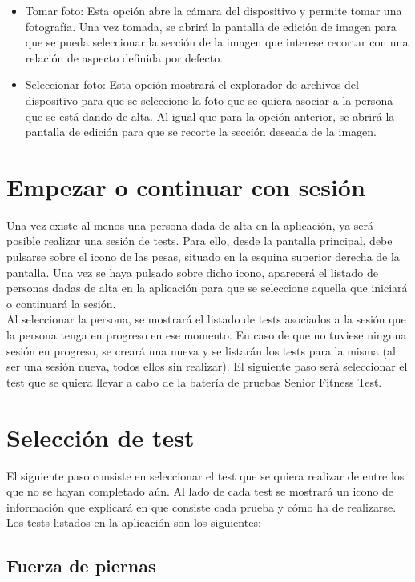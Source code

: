 \begin{itemize}
\item Tomar foto: Esta opción abre la cámara del dispositivo y permite tomar una fotografía. Una vez tomada, se abrirá la pantalla de edición de imagen para que se pueda seleccionar la sección de la imagen que interese recortar con una relación de aspecto definida por defecto.
\item Seleccionar foto: Esta opción mostrará el explorador de archivos del dispositivo para que se seleccione la foto que se quiera asociar a la persona que se está dando de alta. Al igual que para la opción anterior, se abrirá la pantalla de edición para que se recorte la sección deseada de la imagen.
\end{itemize}

\section{Empezar o continuar con sesión}

Una vez existe al menos una persona dada de alta en la aplicación, ya será posible realizar una sesión de tests. Para ello, desde la pantalla principal, debe pulsarse sobre el icono de las pesas, situado en la esquina superior derecha de la pantalla. Una vez se haya pulsado sobre dicho icono, aparecerá el listado de personas dadas de alta en la aplicación para que se seleccione aquella que iniciará o continuará la sesión.\\

Al seleccionar la persona, se mostrará el listado de tests asociados a la sesión que la persona tenga en progreso en ese momento. En caso de que no tuviese ninguna sesión en progreso, se creará una nueva y se listarán los tests para la misma (al ser una sesión nueva, todos ellos sin realizar). El siguiente paso será seleccionar el test que se quiera llevar a cabo de la batería de pruebas Senior Fitness Test.

\section{Selección de test}

El siguiente paso consiste en seleccionar el test que se quiera realizar de entre los que no se hayan completado aún.  Al lado de cada test se mostrará un icono de información que explicará en que consiste cada prueba y cómo ha de realizarse. Los tests listados en la aplicación son los siguientes: 

\subsection{Fuerza de piernas}

